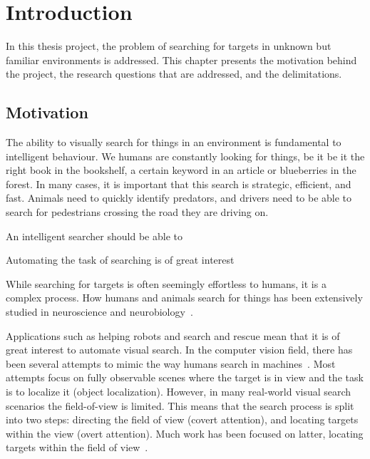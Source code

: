 \chapter{Introduction}
\label{cha:introduction}


In this thesis project, the problem of searching for targets in unknown but familiar environments is addressed.
This chapter presents the motivation behind the project, the research questions that are addressed, and the delimitations. 


\section{Motivation}
\label{sec:motivation}



The ability to visually search for things in an environment is fundamental to intelligent behaviour.
We humans are constantly looking for things, be it be it the right book in the bookshelf, a certain keyword in an article or blueberries in the forest.
In many cases, it is important that this search is strategic, efficient, and fast.
Animals need to quickly identify predators, and drivers need to be able to search for pedestrians crossing the road they are driving on.

An intelligent searcher should be able to 

Automating the task of searching is of great interest

While searching for targets is often seemingly effortless to humans, it is a complex process.
How humans and animals search for things has been extensively studied in neuroscience and neurobiology~\cite{eckstein_visual_2011,wolfe_visual_2010,wolfe_guided_2021}.

Applications such as helping robots and search and rescue mean that it is of great interest to automate visual search.
In the computer vision field, there has been several attempts to mimic the way humans search in machines~\cite{}.
Most attempts focus on fully observable scenes where the target is in view and the task is to localize it (object localization).
However, in many real-world visual search scenarios the field-of-view is limited.
This means that the search process is split into two steps: directing the field of view (covert attention), and locating targets within the view (overt attention).
Much work has been focused on latter, locating targets within the field of view~\cite{}.

